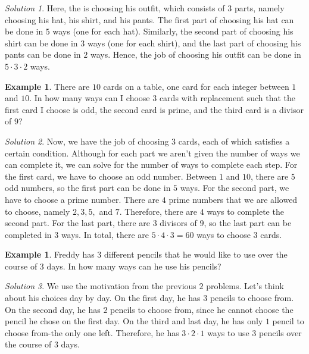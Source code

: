 \documentclass[l1pt]{article}
\theoremstyle{plain}
\theoremstyle{definition}
\newtheorem{example}[thm]{Example}
\theoremstyle{remark}
\newtheorem*{solution}{Solution}
\begin{document}
\begin{solution}
Here, the  is choosing his outfit, which consists of $3$ parts, namely choosing his hat, his shirt, and his pants. The first part of choosing his hat can be done in $5$ ways (one for each hat). Similarly, the second part of choosing his shirt can be done in $3$ ways (one for each shirt), and the last part of choosing his pants can be done in $2$ ways. Hence, the job of choosing his outfit can be done in $5\cdot 3 \cdot 2$ ways.
\end{solution}
\begin{example}
There are $10$ cards on a table, one card for each integer between $1$ and $10$. In how many ways can I choose $3$ cards with replacement such that the first card I choose is odd, the second card is prime, and the third card is a divisor of $9$?
\end{example}

\begin{solution}
Now, we have the job of choosing $3$ cards, each of which satisfies a certain condition. Although for each part we aren't given the number of ways we can complete it, we can solve for the number of ways to complete each step. For the first card, we have to choose an odd number. Between $1$ and $10$, there are $5$ odd numbers, so the first part can be done in $5$ ways. For the second part, we have to choose a prime number. There are $4$ prime numbers that we are allowed to choose, namely $2, 3, 5, $ and $7$. Therefore, there are $4$ ways to complete the second part. For the last part, there are $3$ divisors of $9$, so the last part can be completed in $3$ ways. In total, there are $5\cdot 4 \cdot 3=60$ ways to choose $3$ cards.
\end{solution}

\begin{example}
Freddy has $3$ different pencils that he would like to use over the course of $3$ days. In how many ways can he use his pencils?
\end{example}

\begin{solution}
We use the motivation from the previous $2$ problems. Let's think about his choices day by day. On the first day, he has $3$ pencils to choose from. On the second day, he has $2$ pencils to choose from, since he cannot choose the pencil he chose on the first day. On the third and last day, he has only $1$ pencil to choose from-the only one left. Therefore, he has $3\cdot 2\cdot 1$ ways to use $3$ pencils over the course of $3$ days.
\end{solution}
\end{document}
